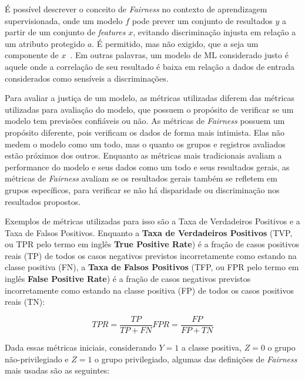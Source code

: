 \documentclass{article}
\begin{document}
É possível descrever o conceito de \textit{Fairness} no contexto de aprendizagem supervisionada, onde um modelo $f$ pode prever um conjunto de resultados $y$ a partir de um conjunto de \textit{features} $x$, evitando discriminação injusta em relação a um atributo protegido $a$. É permitido, mas não exigido, que $a$ seja um componente de $x$~\citep{Begley_2021}. Em outras palavras, um modelo de ML considerado justo é aquele onde a correlação de seu resultado é baixa em relação a dados de entrada considerados como sensíveis a discriminações.

Para avaliar a justiça de um modelo, as métricas utilizadas diferem das métricas utilizadas para avaliação do modelo, que possuem o propósito de verificar se um modelo tem previsões confiáveis ou não. As métricas de \textit{Fairness} possuem um propósito diferente, pois verificam os dados de forma mais intimista. Elas não medem o modelo como um todo, mas o quanto os grupos e registros avaliados estão próximos dos outros. Enquanto as métricas mais tradicionais avaliam a performance do modelo e seus dados como um todo e seus resultados gerais, as métricas de \textit{Fairness} avaliam se os resultados gerais também se refletem em grupos específicos, para verificar se não há disparidade ou discriminação nos resultados propostos.

Exemplos de métricas utilizadas para isso são a Taxa de Verdadeiros Positivos e a Taxa de Falsos Positivos. Enquanto a \textbf{Taxa de Verdadeiros Positivos} (TVP, ou TPR pelo termo em inglês \textbf{True Positive Rate}) é a fração de casos positivos reais (TP) de todos os casos negativos previstos incorretamente como estando na classe positiva (FN), a \textbf{Taxa de Falsos Positivos} (TFP, ou FPR pelo termo em inglês \textbf{False Positive Rate}) é a fração de casos negativos previstos incorretamente como estando na classe positiva (FP) de todos os casos positivos reais (TN):

\begin{equation}
TPR = \frac{TP}{TP + FN}
FPR = \frac{FP}{FP + TN}
\end{equation}

Dada essas métricas iniciais, considerando $Y=1$ a classe positiva, $Z=0$ o grupo não-privilegiado e $Z=1$ o grupo privilegiado, algumas das definições de \textit{Fairness} mais usadas são as seguintes:
\end{document}

